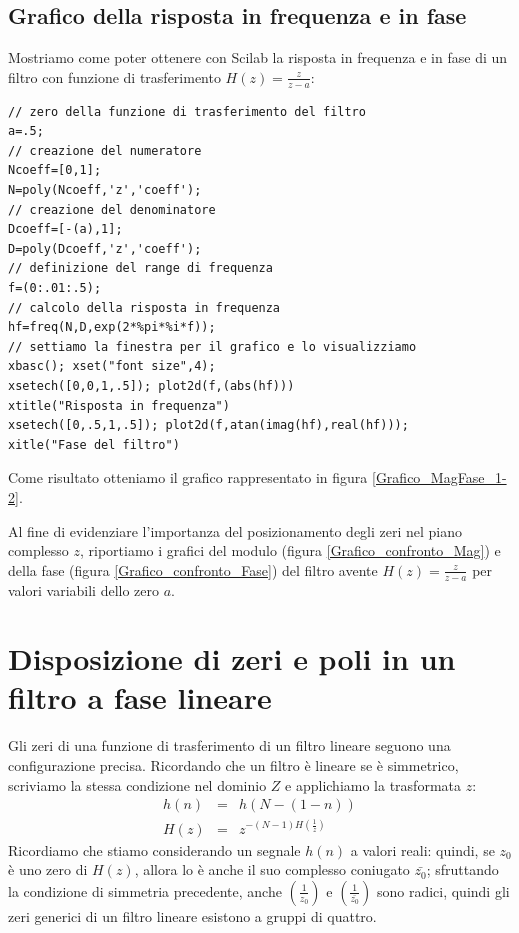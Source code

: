 \subsection{Grafico della risposta in frequenza e in fase}

Mostriamo come poter ottenere con Scilab la risposta in frequenza e in fase di un filtro con funzione di trasferimento $H(z)=\frac{z}{z-a}$:

\begin{verbatim}
// zero della funzione di trasferimento del filtro
a=.5;
// creazione del numeratore
Ncoeff=[0,1];
N=poly(Ncoeff,'z','coeff');
// creazione del denominatore
Dcoeff=[-(a),1];
D=poly(Dcoeff,'z','coeff');
// definizione del range di frequenza
f=(0:.01:.5);
// calcolo della risposta in frequenza
hf=freq(N,D,exp(2*%pi*%i*f));
// settiamo la finestra per il grafico e lo visualizziamo
xbasc(); xset("font size",4);
xsetech([0,0,1,.5]); plot2d(f,(abs(hf)))
xtitle("Risposta in frequenza")
xsetech([0,.5,1,.5]); plot2d(f,atan(imag(hf),real(hf)));
xitle("Fase del filtro")
\end{verbatim}
Come risultato otteniamo il grafico rappresentato in figura \ref{Grafico_MagFase_1-2}.

                                                                               
Al fine di evidenziare l'importanza del posizionamento degli zeri nel piano complesso $z$, riportiamo i grafici del modulo (figura \ref{Grafico_confronto_Mag}) e della fase (figura \ref{Grafico_confronto_Fase}) del filtro avente $H(z)=\frac{z}{z-a}$ per valori variabili dello zero $a$.




\section*{Disposizione di zeri e poli in un filtro a fase lineare}
Gli zeri di una funzione di trasferimento di un filtro lineare seguono una configurazione precisa.
Ricordando che un filtro \`e lineare se \`e simmetrico, scriviamo la stessa condizione nel dominio $Z$ e applichiamo la trasformata $z$:
\begin{eqnarray*}
h(n) & = & h(N-(1-n)) \\
H(z) & = & z^{-(N-1)H\left (\frac{1}{z}\right )}
\end{eqnarray*}
Ricordiamo che stiamo considerando un segnale ${h(n)}$ a valori reali: quindi, se $z_0$ \`e uno zero di $H(z)$, allora lo \`e anche il suo complesso coniugato $\bar{z_0}$; sfruttando la condizione di simmetria precedente, anche $\left (\frac{1}{z_0}\right )$ e $\left (\frac{1}{\bar{z_0}}\right )$ sono radici, quindi gli zeri generici di un filtro lineare esistono a gruppi di quattro.

